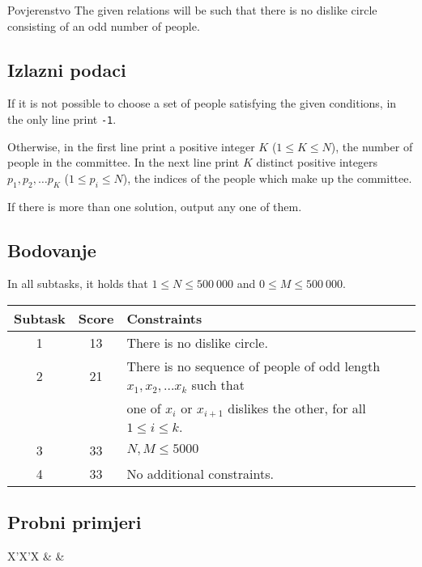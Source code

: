 \begin{statement}[
  problempoints=100,
  timelimit=3 seconds,
  memorylimit=512 MiB,
]{Povjerenstvo}
The given relations will be such that there is no dislike circle consisting 
of an odd number of people.

\subsection*{Izlazni podaci}

If it is not possible to choose a set of people satisfying the given conditions, 
in the only line print \texttt{-1}.

Otherwise, in the first line print a positive integer $K$ ($1 \leq K \leq N$), 
the number of people in the committee. In the next line print $K$ distinct 
positive integers $p_1, p_2, \dots p_K$ ($1 \leq p_i \leq N$), the indices of 
the people which make up the committee.

If there is more than one solution, output any one of them.

\subsection*{Bodovanje}

In all subtasks, it holds that $1 \leq N \leq 500~000$ and $0 \leq M \leq 500~000$.

{\renewcommand{\arraystretch}{1.4}
  \setlength{\tabcolsep}{6pt}
  \begin{tabular}{ccl}
   Subtask & Score & Constraints \\ \midrule
    1 & 13 & There is no dislike circle. \\
    2 & 21 & There is no sequence of people of odd length $x_1, x_2, \dots x_k$ such that \\
      &    & one of $x_i$ or $x_{i+1}$ dislikes the other, for all $1 \leq i \leq k$. \\
    3 & 33 & $N, M \leq 5000$ \\
    4 & 33 & No additional constraints.
\end{tabular}}

\subsection*{Probni primjeri}
\begin{tabularx}{\textwidth}{X'X'X}
 &
 &
\end{tabularx}


\end{statement}
